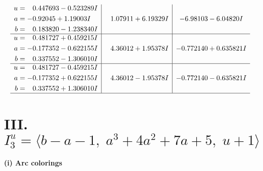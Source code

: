 \documentclass[1p]{elsarticle_modified}
\theoremstyle{definition}
\begin{document}
$$\begin{array}{c|c|c}
\begin{aligned}
u &= \phantom{-}0.447693 - 0.523289 I \\
a &= -0.92045 + 1.19003 I \\
b &= \phantom{-}0.183820 - 1.238340 I\end{aligned}
 & \phantom{-}1.07911 + 6.19329 I & -6.98103 - 6.04820 I \\ \hline\begin{aligned}
u &= \phantom{-}0.481727 + 0.459215 I \\
a &= -0.177352 - 0.622155 I \\
b &= \phantom{-}0.337552 - 1.306010 I\end{aligned}
 & \phantom{-}4.36012 + 1.95378 I & -0.772140 + 0.635821 I \\ \hline\begin{aligned}
u &= \phantom{-}0.481727 - 0.459215 I \\
a &= -0.177352 + 0.622155 I \\
b &= \phantom{-}0.337552 + 1.306010 I\end{aligned}
 & \phantom{-}4.36012 - 1.95378 I & -0.772140 - 0.635821 I\\
 \hline 
 \end{array}$$\newpage\newpage\renewcommand{\arraystretch}{1}
\centering \section*{III. $I^u_{3}= \langle b- a-1,\;a^3+4 a^2+7 a+5,\;u+1 \rangle$}
\flushleft \textbf{(i) Arc colorings}\\
\end{document}
